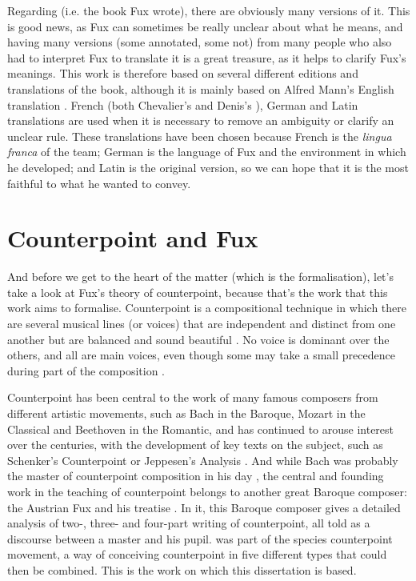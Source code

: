 Regarding \gaps (i.e. the book Fux wrote), there are obviously many versions of it. This is good news, as Fux can sometimes be really unclear about what he means, and having many versions (some annotated, some not) from many people who also had to interpret Fux to translate it is a great treasure, as it helps to clarify Fux's meanings. This work is therefore based on several different editions and translations of the book, although it is mainly based on Alfred Mann's English translation \cite{GaPEng}. French (both Chevalier's \cite{GaPFrChevalier} and Denis's \cite{GaPFrDenis}), German \cite{GaPDe} and Latin \cite{GapLa} translations are used when it is necessary to remove an ambiguity or clarify an unclear rule. These translations have been chosen because French is the \textit{lingua franca} of the team; German is the language of Fux and the environment in which he developed; and Latin is the original version, so we can hope that it is the most faithful to what he wanted to convey.


\section{Counterpoint and Fux}
And before we get to the heart of the matter (which is the formalisation), let's take a look at Fux's theory of counterpoint, because that's the work that this work aims to formalise. Counterpoint is a compositional technique in which there are several musical lines (or voices) that are independent and distinct from one another but are balanced and sound beautiful \cite{CpSachs}. No voice is dominant over the others, and all are main voices, even though some may take a small precedence during part of the composition \cite{hess2016}.  


Counterpoint has been central to the work of many famous composers from different artistic movements, such as Bach in the Baroque, Mozart in the Classical and Beethoven in the Romantic, and has continued to arouse interest over the centuries, with the development of key texts on the subject, such as Schenker's Counterpoint \cite{schenker1906} or Jeppesen's Analysis \cite{jeppesen1960}. And while Bach was probably the master of counterpoint composition in his day \cite{yearsley2002}, the central and founding work in the teaching of counterpoint belongs to another great Baroque composer: the Austrian Fux and his treatise \gap. In it, this Baroque composer gives a detailed analysis of two-, three- and four-part writing of counterpoint, all told as a discourse between a master and his pupil. \gaps  was part of the species counterpoint movement, a way of conceiving counterpoint in five different types that could then be combined. This is the work on which this dissertation is based. 


